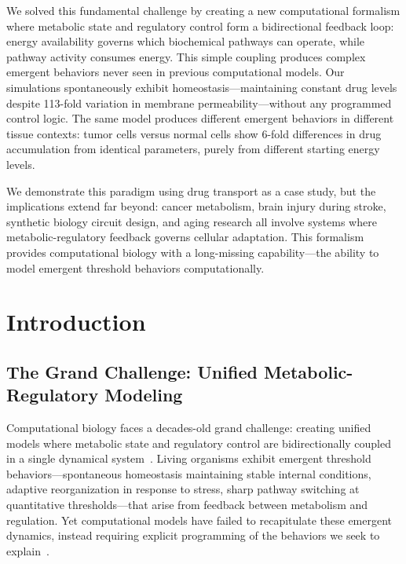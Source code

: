 \documentclass[10pt,letterpaper]{article}
\begin{document}
We solved this fundamental challenge by creating a new computational formalism where metabolic state and regulatory control form a bidirectional feedback loop: energy availability governs which biochemical pathways can operate, while pathway activity consumes energy. This simple coupling produces complex emergent behaviors never seen in previous computational models. Our simulations spontaneously exhibit homeostasis—maintaining constant drug levels despite 113-fold variation in membrane permeability—without any programmed control logic. The same model produces different emergent behaviors in different tissue contexts: tumor cells versus normal cells show 6-fold differences in drug accumulation from identical parameters, purely from different starting energy levels.

We demonstrate this paradigm using drug transport as a case study, but the implications extend far beyond: cancer metabolism, brain injury during stroke, synthetic biology circuit design, and aging research all involve systems where metabolic-regulatory feedback governs cellular adaptation. This formalism provides computational biology with a long-missing capability—the ability to model emergent threshold behaviors computationally.

\section{Introduction}

\subsection{The Grand Challenge: Unified Metabolic-Regulatory Modeling}

Computational biology faces a decades-old grand challenge: creating unified models where metabolic state and regulatory control are bidirectionally coupled in a single dynamical system~\cite{Kitano2002,Alon2006,Palsson2015}. Living organisms exhibit emergent threshold behaviors—spontaneous homeostasis maintaining stable internal conditions, adaptive reorganization in response to stress, sharp pathway switching at quantitative thresholds—that arise from feedback between metabolism and regulation. Yet computational models have failed to recapitulate these emergent dynamics, instead requiring explicit programming of the behaviors we seek to explain~\cite{Karr2012,Thiele2013}.
\end{document}
